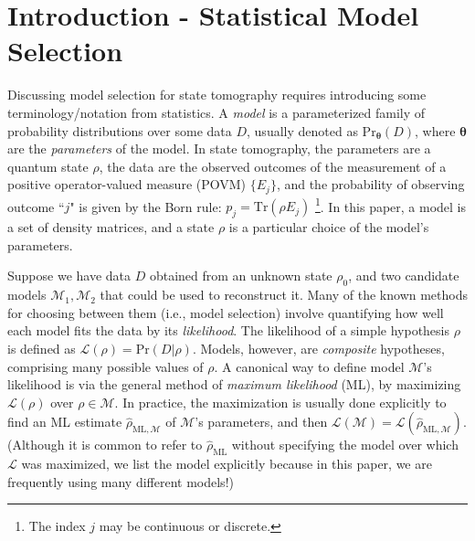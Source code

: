 \documentclass[aps,pra, twocolumn]{revtex4-1}
\newcommand{\bs}[1]{\boldsymbol{#1}}
\newcommand{\M}{\mathcal{M}}
\newcommand{\cL}{\mathcal{L}}
\begin{document}
\section{Introduction - Statistical Model Selection}
\label{sec:intro}
Discussing model selection for state tomography requires introducing some terminology/notation from statistics.  A \emph{model} is a parameterized family of probability distributions over some data $D$, usually denoted as $\mathrm{Pr}_{\bs{\theta}}(D)$, where $\bs{\theta}$ are the \emph{parameters} of the model. In state tomography, the parameters are a quantum state $\rho$, the data are the observed outcomes of the measurement of a positive operator-valued measure (POVM) $\{E_{j}\}$, and the probability of observing outcome ``$j$" is given by the Born rule: $p_{j} = \mathrm{Tr}(\rho E_{j})$ \footnote{The index $j$ may be continuous or discrete.}. In this paper, a model is a set of density matrices, and a state $\rho$ is a particular choice of the model's parameters.

Suppose we have data $D$ obtained from an unknown state $\rho_{0}$, and two candidate models $\M_{1}, \M_{2}$ that could be used to reconstruct it.  Many of the known methods for choosing between them (i.e., model selection) involve quantifying how well each model fits the data by its \emph{likelihood}.  The likelihood of a simple hypothesis $\rho$ is defined as $\mathcal{L}(\rho) = \mathrm{Pr}(D|\rho)$.  Models, however, are \emph{composite} hypotheses, comprising many possible values of $\rho$.  A canonical way to define model $\M$'s likelihood is via the general method of \emph{maximum likelihood} (ML), by maximizing $\cL(\rho)$ over $\rho\in\M$.  In practice, the maximization is usually done explicitly to find an ML estimate $\hat{\rho}_{\mathrm{ML},\M}$ \cite{Hradil1997, JamesPRA2001, Blume-Kohout2010} of $\M$'s parameters, and then $\cL(\M) = \cL(\hat{\rho}_{\mathrm{ML},\M})$.  (Although it is common to refer to $\hat\rho_{\mathrm{ML}}$ without specifying the model over which $\cL$ was maximized, we list the model explicitly because in this paper, we are frequently using many different models!)
\end{document}
